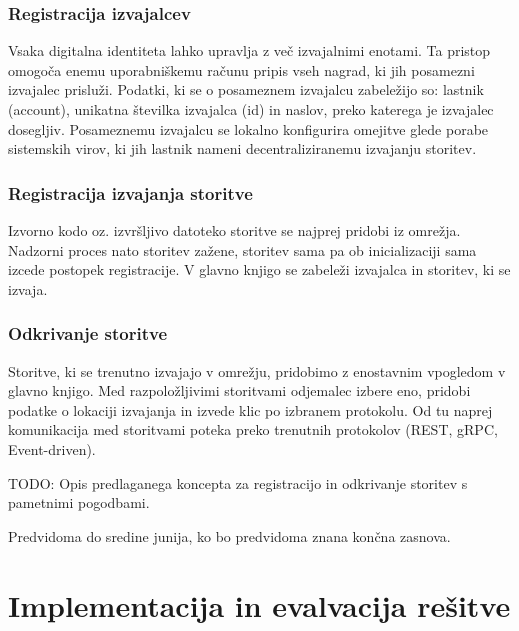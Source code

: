 \documentclass[a4paper, 12pt]{book}
\begin{document}
\subsection{Registracija izvajalcev}
\label{registerWorker}
Vsaka digitalna identiteta lahko upravlja z več izvajalnimi enotami.
Ta pristop omogoča enemu uporabniškemu računu pripis vseh nagrad, ki jih posamezni izvajalec prisluži.
Podatki, ki se o posameznem izvajalcu zabeležijo so: lastnik (account), unikatna številka izvajalca (id) in naslov, preko katerega je izvajalec dosegljiv.
Posameznemu izvajalcu se lokalno konfigurira omejitve glede porabe sistemskih virov, ki jih lastnik nameni decentraliziranemu izvajanju storitev.

\subsection{Registracija izvajanja storitve}
\label{registerExecution}
Izvorno kodo oz. izvršljivo datoteko storitve se najprej pridobi iz omrežja.
Nadzorni proces nato storitev zažene, storitev sama pa ob inicializaciji sama izcede postopek registracije.
V glavno knjigo se zabeleži izvajalca in storitev, ki se izvaja.

\subsection{Odkrivanje storitve}
\label{serviceDiscovery}
Storitve, ki se trenutno izvajajo v omrežju, pridobimo z enostavnim vpogledom v glavno knjigo.
Med razpoložljivimi storitvami odjemalec izbere eno, pridobi podatke o lokaciji izvajanja in izvede klic po izbranem protokolu.
Od tu naprej komunikacija med storitvami poteka preko trenutnih protokolov (REST, gRPC, Event-driven).

TODO: Opis predlaganega koncepta za registracijo in odkrivanje storitev s pametnimi pogodbami.

Predvidoma do sredine junija, ko bo predvidoma znana končna zasnova.

\chapter{Implementacija in evalvacija rešitve}
\label{ch5}
\end{document}
